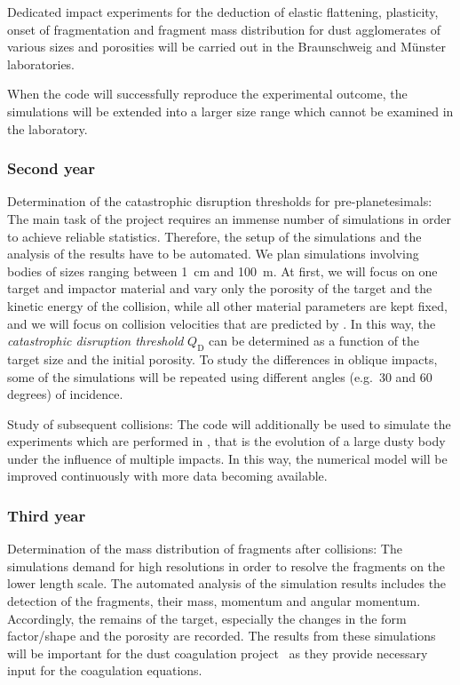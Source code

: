 Dedicated impact experiments for the deduction of elastic flattening,
plasticity, onset of fragmentation and fragment mass distribution for
dust agglomerates of various sizes and porosities will be carried out
in the Braunschweig and M\"unster laboratories.

When the code will successfully reproduce the experimental
outcome, the simulations will be extended into a larger size range which
cannot be examined in the laboratory.

\subsubsection{Second year}

Determination of the catastrophic disruption thresholds for
pre-planetesimals: The main task of the project requires an immense
number of simulations in order to achieve reliable statistics.
Therefore, the setup of the simulations and the analysis of the results
have to be automated. We plan simulations involving bodies of sizes
ranging between 1~cm and 100~m.
At first, we will focus on one target and impactor material and vary
only the porosity of the target and the kinetic energy of the collision,
while all other material parameters are kept fixed, and we will focus on
collision velocities that are predicted by \projklahr. In this way, the
{\it catastrophic disruption threshold} $Q_\mathrm{D}$ can be determined
as a function of the target size and the initial porosity.  To study the
differences in oblique impacts, some of the simulations will be repeated
using different angles (e.g.\ 30 and 60 degrees) of incidence.

Study of subsequent collisions: The code will 
additionally be used to simulate the experiments which are performed in
\projwurm, that is the evolution of a large dusty body under the
influence of multiple impacts. In this way, the numerical model will be
improved continuously with more data becoming available.

\subsubsection{Third year}
%
%
Determination of the mass distribution of fragments after collisions:
The simulations demand for high
resolutions in order to resolve the fragments on the lower length scale.
The automated analysis of the simulation results includes the detection
of the fragments, their mass, momentum and angular momentum.
Accordingly, the remains of the target, especially the changes in the
form factor/shape and the porosity are recorded. The results from these
simulations will be important for the dust coagulation project \projdul\
as they provide necessary input for the coagulation equations.

